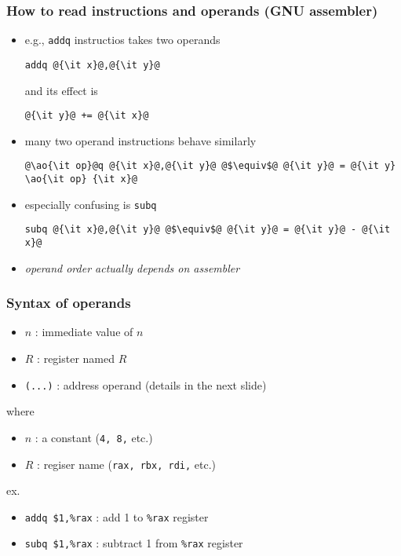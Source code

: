 \documentclass[12pt,dvipdfmx]{beamer}
\newcommand{\ao}[1]{{\color{blue}#1}}
\newcommand{\aka}[1]{{\color{red}#1}}
\begin{document}
\begin{frame}[fragile]
  \frametitle{How to read instructions and operands (GNU assembler)}
  \begin{itemize}
  \item e.g., {\tt addq} instructios takes two operands
\begin{lstlisting}
addq @{\it x}@,@{\it y}@
\end{lstlisting}
and its effect is 
\begin{lstlisting}
@{\it y}@ += @{\it x}@
\end{lstlisting}
\item many two operand instructions behave similarly
\begin{lstlisting}
@\ao{\it op}@q @{\it x}@,@{\it y}@ @$\equiv$@ @{\it y}@ = @{\it y} \ao{\it op} {\it x}@
\end{lstlisting}
\item especially confusing is \ao{\tt subq}
\begin{lstlisting}
subq @{\it x}@,@{\it y}@ @$\equiv$@ @{\it y}@ = @{\it y}@ - @{\it x}@
\end{lstlisting}
\item \aka{\it operand order actually depends on assembler}
\end{itemize}
\end{frame}

\begin{frame}
  \frametitle{Syntax of operands}
  \begin{itemize}
  \item \ao{{\tt \$}$n$} : immediate value of $n$
  \item \ao{{\tt \%}$R$} : register named $R$
  \item \ao{\tt (...)} : address operand (details in the next slide)
  \end{itemize}
  where
  \begin{itemize}
  \item $n$ : a constant ({\tt 4, 8,} etc.)
  \item $R$ : regiser name ({\tt rax, rbx, rdi,} etc.)
  \end{itemize}
  ex.
  \begin{itemize}
  \item \ao{\tt addq \$1,\%rax} : add 1 to {\tt \%rax} register
  \item \ao{\tt subq \$1,\%rax} : subtract 1 from {\tt \%rax} register
  \end{itemize}
\end{frame}
\end{document}
